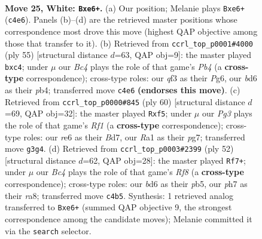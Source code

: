\documentclass[11pt]{article}
\begin{document}
\clearpage

\begin{figure}[p]\centering
\begin{subfigure}{0.46\textwidth}\centering
\resizebox{\linewidth}{!}{%
\newchessgame
\chessboard[
  setfen={6k1/pp5p/3br1p1/8/2B5/5qP1/PP3P1P/R5K1 w - - 0 25},
  showmover=false,
  pgfstyle=straightmove, color=movearrow, markmove={c4-e6}
]}
\caption{}
\end{subfigure}\hfill
\begin{subfigure}{0.46\textwidth}\centering
\resizebox{\linewidth}{!}{%
\newchessgame
\chessboard[
  setfen={r5k1/5p1p/p5p1/1p2P3/1PQ2P2/7P/6P1/3R2K1 b - - 0 28},
  showmover=false,
  pgfstyle=straightmove, color=movearrow, markmove={b5-c4}
]}
\caption{}
\end{subfigure}
\\[4pt]
\begin{subfigure}{0.46\textwidth}\centering
\resizebox{\linewidth}{!}{%
\newchessgame
\chessboard[
  setfen={3r2k1/3Bb1p1/4P3/2p1Pq1p/p7/P2p2P1/1P5P/5RK1 w - - 0 31},
  showmover=false,
  pgfstyle=straightmove, color=movearrow, markmove={f1-f5}
]}
\caption{}
\end{subfigure}\hfill
\begin{subfigure}{0.46\textwidth}\centering
\resizebox{\linewidth}{!}{%
\newchessgame
\chessboard[
  setfen={r1b2R2/p6k/4p2p/1p6/8/1P1qPP2/P4P1P/4K1R1 w - - 4 27},
  showmover=false,
  pgfstyle=straightmove, color=movearrow, markmove={f8-f7}
]}
\caption{}
\end{subfigure}
\caption{\textbf{Move 25, White: \texttt{Bxe6+}.} (a) Our position; Melanie plays \texttt{Bxe6+} (\texttt{c4e6}). Panels (b)--(d) are the retrieved master positions whose correspondence most drove this move (highest QAP objective among those that transfer to it). (b) Retrieved from \texttt{ccrl\_top\_p0001\#4000} (ply 55) [structural distance $d$=63, QAP obj=9]: the master played \texttt{bxc4}; under $\mu$ our \emph{Bc4} plays the role of that game's \emph{Pb4} (a \textbf{cross-type} correspondence); cross-type roles: our \emph{q}f3 as their \emph{P}g6, our \emph{b}d6 as their \emph{p}b4; transferred move \texttt{c4e6} \textbf{(endorses this move)}. (c) Retrieved from \texttt{ccrl\_top\_p0000\#845} (ply 60) [structural distance $d$=69, QAP obj=32]: the master played \texttt{Rxf5}; under $\mu$ our \emph{Pg3} plays the role of that game's \emph{Rf1} (a \textbf{cross-type} correspondence); cross-type roles: our \emph{r}e6 as their \emph{B}d7, our \emph{R}a1 as their \emph{p}g7; transferred move \texttt{g3g4}. (d) Retrieved from \texttt{ccrl\_top\_p0003\#2399} (ply 52) [structural distance $d$=62, QAP obj=28]: the master played \texttt{Rf7+}; under $\mu$ our \emph{Bc4} plays the role of that game's \emph{Rf8} (a \textbf{cross-type} correspondence); cross-type roles: our \emph{b}d6 as their \emph{p}b5, our \emph{p}h7 as their \emph{r}a8; transferred move \texttt{c4b5}. Synthesis: 1 retrieved analog transferred to \texttt{Bxe6+} (summed QAP objective 9, the strongest correspondence among the candidate moves); Melanie committed it via the \texttt{search} selector.}
\label{fig:thought-m48}
\end{figure}
\end{document}
